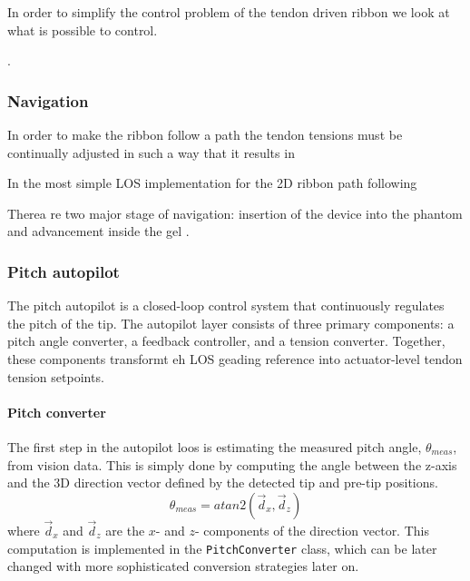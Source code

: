 
In order to simplify the control problem of the tendon driven ribbon we look at what is possible to control. 



.

\subsubsection{Navigation}
In order to make the ribbon follow a path the tendon tensions must be continually adjusted in such a way that it results in 

In the most simple LOS implementation for the 2D ribbon path following 

Therea re two major stage of navigation: insertion of the device into the phantom and advancement inside the gel \cite{noseda_flat_2024}. 

\subsubsection{Pitch autopilot}
The pitch autopilot is a closed-loop control system that continuously regulates the pitch of the tip. The autopilot layer consists of three primary components: a pitch angle converter, a feedback controller, and a tension converter. Together, these components transformt eh LOS geading reference into actuator-level tendon tension setpoints.

\paragraph*{Pitch converter}
The first step in the autopilot loos is estimating the measured pitch angle, \(\theta_{meas}\), from vision data. This is simply done by computing the angle between the z-axis and the 3D direction vector defined by the detected tip and pre-tip positions. 
\begin{equation}
    \theta_{meas} = atan2(\vec{d}_x,\vec{d}_z)
\end{equation}
where \(\vec{d}_x\) and \(\vec{d}_z\) are the \(x\)- and \(z\)- components of the direction vector. This computation is implemented in the \texttt{PitchConverter} class,  which can be later changed with more sophisticated conversion strategies later on.

